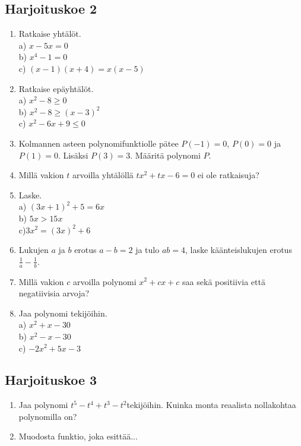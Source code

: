 \subsection*{Harjoituskoe 2}

\begin{enumerate}
\item Ratkaise yhtälöt.\\ a) $x-5x=0$\\ b) $x^4-1=0$\\ c) $(x-1)(x+4) = x(x-5)$
\item Ratkaise epäyhtälöt.\\ a) $x^2-8\geq0$\\ b) $x^2-8\geq(x-3)^2$\\ c) $x^2-6x+9\leq0$
\item Kolmannen asteen polynomifunktiolle pätee $P(-1)=0$, $P(0)=0$ ja $P(1)=0$. Lisäksi $P(3)=3$. Määritä polynomi $P$.
\item Millä vakion $t$ arvoilla yhtälöllä $tx^2+tx-6=0$ ei ole ratkaisuja?
\item Laske. \\ a) $(3x+1)^2+5=6x$\\ b) $5x>15x$\\ c)$3x^2=(3x)^2+6$ 
\item Lukujen $a$ ja $b$ erotus $a-b=2$ ja tulo $ab=4$, laske käänteislukujen erotus $\frac{1}{a}-\frac{1}{b}$.
\item Millä vakion $c$ arvoilla polynomi $x^2+cx+c$ saa sekä positiivia että negatiivisia arvoja?
\item Jaa polynomi tekijöihin.\\ a) $x^2+x-30$\\ b)  $x^2-x-30$\\ c)  $-2x^2+5x-3$ 
\end{enumerate}


\subsection*{Harjoituskoe 3}

\begin{enumerate}
\item Jaa polynomi $t^5-t^4+t^3-t^2$tekijöihin. Kuinka monta reaalista nollakohtaa polynomilla on?
\item Muodosta funktio, joka esittää...
\end{enumerate}


